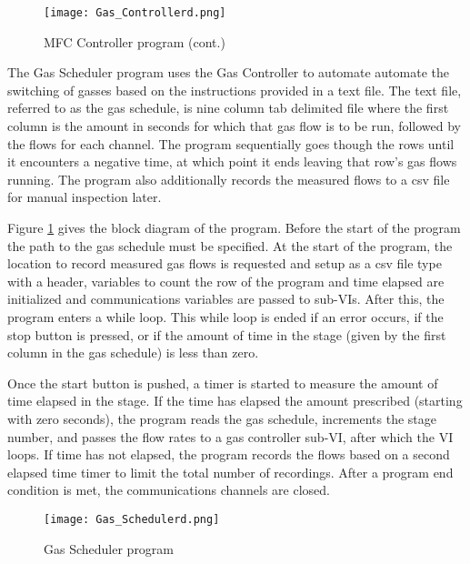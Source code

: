 \begin{landscape}
        \begin{figure}\ContinuedFloat
            \begin{center}
            \texttt{[image: Gas\_Controllerd.png]}
            \end{center}
            \caption[]{MFC Controller program (cont.)}
        \end{figure}%
    \end{landscape}

    The Gas Scheduler program uses the Gas Controller to automate automate the switching of gasses based on the instructions provided in a text file.
    The text file, referred to as the gas schedule, is nine column tab delimited file where the first column is the amount in seconds for which that gas flow is to be run, followed by the flows for each channel.
    The program sequentially goes though the rows until it encounters a negative time, at which point it ends leaving that row's gas flows running.
    The program also additionally records the measured flows to a csv file for manual inspection later.

    Figure \ref{fig:gasschedvi} gives the block diagram of the program.
    Before the start of the program the path to the gas schedule must be specified.
    At the start of the program, the location to record measured gas flows is requested and setup as a csv file type with a header, variables to count the row of the program and time elapsed are initialized and communications variables are passed to sub-VIs.
    After this, the program enters a while loop.
    This while loop is ended if an error occurs, if the stop button is pressed, or if the amount of time in the stage (given by the first column in the gas schedule) is less than zero.

    Once the start button is pushed, a timer is started to measure the amount of time elapsed in the stage.
    If the time has elapsed the amount prescribed (starting with zero seconds), the program reads the gas schedule, increments the stage number, and passes the flow rates to a gas controller sub-VI, after which the VI loops.
    If time has not elapsed, the program records the flows based on a second elapsed time timer to limit the total number of recordings.
    After a program end condition is met, the communications channels are closed.

    \begin{landscape}%
        \begin{figure}
            \begin{center}
            \texttt{[image: Gas\_Schedulerd.png]}
            \end{center}
            \caption{Gas Scheduler program}
            \label{fig:gasschedvi}
        \end{figure}
    \end{landscape}


